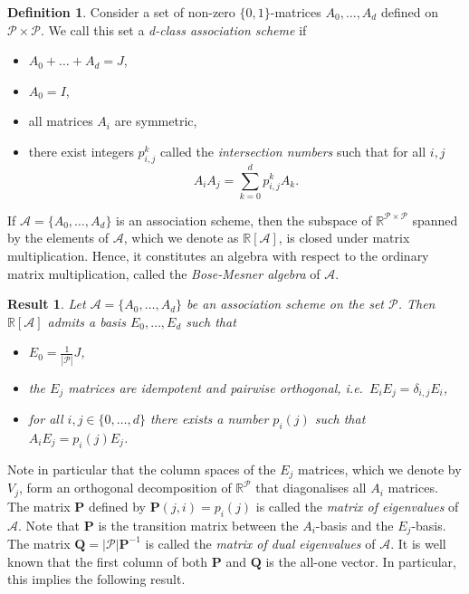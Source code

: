 \documentclass[a4paper]{article}
\newtheorem{res}[thm]{Result}
\theoremstyle{definition}
\newtheorem{df}[thm]{Definition}
\newcommand{\RR}{\mathbb R}
\newcommand{\pp}{\mathcal P}
\newcommand{\ma}{\mathcal A}
\begin{document}
\begin{df}
 \label{DfAssocMatrices}
 Consider a set of non-zero $\{0,1\}$-matrices $A_0, \dots, A_d$ defined on $\pp \times \pp$.
 We call this set a \emph{d-class association scheme} if
 \begin{itemize}
  \item $A_0 + \ldots + A_d = J$,
  \item $A_0 = I$,
  \item all matrices $A_i$ are symmetric,
  \item there exist integers $p^k_{i,j}$ called the \emph{intersection numbers} such that for all $i,j$
  \[
   A_i A_j = \sum_{k=0}^d p^k_{i,j} A_k.
  \]
  \end{itemize}
\end{df}

If $\ma = \{A_0, \dots, A_d\}$ is an association scheme, then the subspace of $\RR^{\pp \times \pp}$ spanned by the elements of $\ma$, which we denote as $\RR[\ma]$, is closed under matrix multiplication.
Hence, it constitutes an algebra with respect to the ordinary matrix multiplication, called the \emph{Bose-Mesner algebra} of $\ma$.

\begin{res}
 Let $\ma = \{A_0, \dots, A_d\}$ be an association scheme on the set $\pp$.
 Then $\RR[\ma]$ admits a basis $E_0, \dots, E_d$ such that
 \begin{itemize}
  \item $E_0 = \frac 1 {|\pp|} J$,
  \item the $E_j$ matrices are idempotent and pairwise orthogonal, i.e.\ $E_i E_j = \delta_{i,j} E_i$,
  \item for all $i,j \in \{0,\dots,d\}$ there exists a number $p_i(j)$ such that $A_i E_j = p_i(j) E_j$.
 \end{itemize}
\end{res}

Note in particular that the column spaces of the $E_j$ matrices, which we denote by $V_j$, form an orthogonal decomposition of $\RR^{\pp}$ that diagonalises all $A_i$ matrices.
The matrix $\mathbf P$ defined by $\mathbf P(j,i) = p_i(j)$ is called the \emph{matrix of eigenvalues} of $\ma$.
Note that $\mathbf P$ is the transition matrix between the $A_i$-basis and the $E_j$-basis.
The matrix $\mathbf Q = |\pp| \mathbf P^{-1}$ is called the \emph{matrix of dual eigenvalues} of $\ma$.
It is well known that the first column of both $\mathbf P$ and $\mathbf Q$ is the all-one vector.
In particular, this implies the following result.
\end{document}
